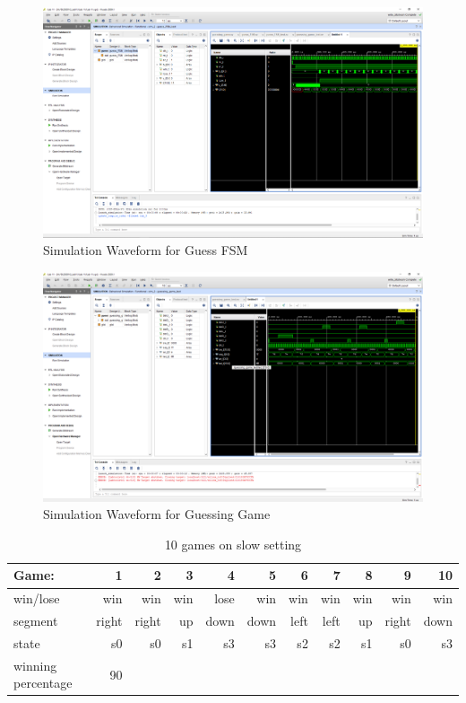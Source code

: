 \documentclass[11pt]{article}
\begin{document}
\begin{figure}[ht]\centering
	\caption{Simulation Waveform for Guess FSM}
	\includegraphics [width=1\textwidth,trim=640 550 10 135, clip]{guess_FSM_sim}
\end{figure}

\begin{figure}[ht]\centering
	\caption{Simulation Waveform for Guessing Game}
	\includegraphics [width=1\textwidth,trim=640 550 10 135, clip]{guessing_game_sim}
\end{figure}

\begin{table}[ht]\centering
	\caption{10 games on slow setting}
	\label{ALU:tbl:alu_ERT}\medskip
	\begin{tabular}{l|rrrrrrrrrr}
		Game: & 1 & 2 & 3 & 4 & 5 & 6 & 7 & 8 & 9 & 10 \\
		\midrule
		win/lose & win & win & win & lose & win & win & win & win & win & win\\
		segment & right & right & up & down & down & left & left & up & right & down \\
		state & s0 & s0 & s1 & s3 & s3 & s2 & s2 & s1 & s0 & s3\\
		\midrule
		winning percentage & 90 &  &  &  &  & & & & &\\
		\bottomrule
	\end{tabular}
\end{table}
\end{document}

